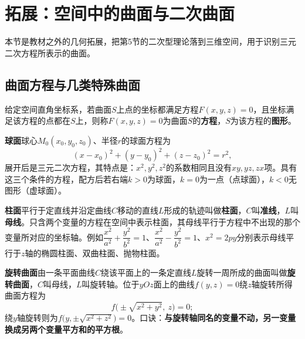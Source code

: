 


\section{拓展：空间中的曲面与二次曲面}

本节是教材之外的几何拓展，把第5节的二次型理论落到三维空间，用于识别三元二次方程所表示的曲面。

\subsection{曲面方程与几类特殊曲面}
给定空间直角坐标系，若曲面$S$上点的坐标都满足方程$F(x,y,z)=0$，且坐标满足该方程的点都在$S$上，则称$F(x,y,z)=0$为曲面$S$的\textbf{方程}，$S$为该方程的\textbf{图形}。

\textbf{球面}\quad 球心$M_0(x_0,y_0,z_0)$、半径$r$的球面方程为
\[
(x-x_0)^{2}+(y-y_0)^{2}+(z-z_0)^{2}=r^{2},
\]
展开后是三元二次方程，其特点是：$x^{2},y^{2},z^{2}$的系数相同且没有$xy,yz,zx$项。具有这三个条件的方程，配方后若右端$k>0$为球面，$k=0$为一点（点球面），$k<0$无图形（虚球面）。

\textbf{柱面}\quad 平行于定直线并沿定曲线$C$移动的直线$L$形成的轨迹叫做\textbf{柱面}，$C$叫\textbf{准线}，$L$叫\textbf{母线}。只含两个变量的方程在空间中表示柱面，其母线平行于方程中不出现的那个变量所对应的坐标轴。例如$\dfrac{x^{2}}{a^{2}}+\dfrac{y^{2}}{b^{2}}=1$、$\dfrac{x^{2}}{a^{2}}-\dfrac{y^{2}}{b^{2}}=1$、$x^{2}=2py$分别表示母线平行于$z$轴的椭圆柱面、双曲柱面、抛物柱面。

\textbf{旋转曲面}\quad 由一条平面曲线$C$绕该平面上的一条定直线$L$旋转一周所成的曲面叫做\textbf{旋转曲面}，$C$叫母线，$L$叫旋转轴。位于$yOz$面上的曲线$f(y,z)=0$绕$z$轴旋转所得曲面方程为
\[
f\bigl(\pm\sqrt{x^{2}+y^{2}},\ z\bigr)=0 ;
\]
绕$y$轴旋转则为$f\bigl(y,\pm\sqrt{x^{2}+z^{2}}\bigr)=0$。口诀：\textbf{与旋转轴同名的变量不动，另一变量换成另两个变量平方和的平方根}。

